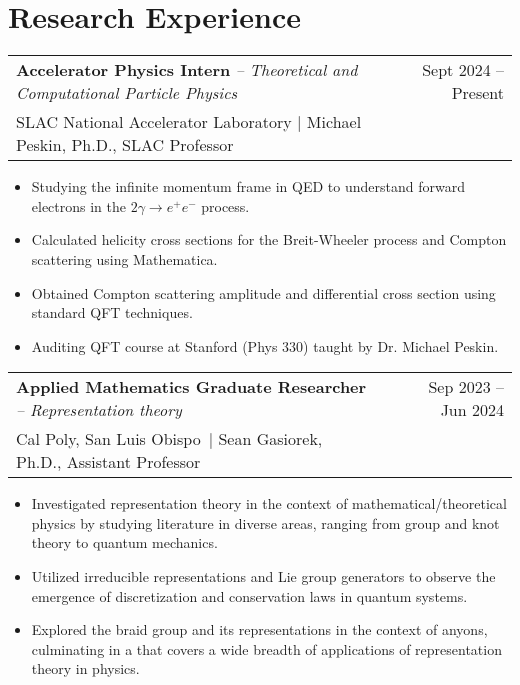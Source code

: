 \documentclass[a4paper,11pt]{article}
\makeatletter
\newcommand{\colhref}[3]{\href{#2}{\color{#1}{#3}}} %
\newenvironment{jobcustomlong}[4]
    {
    \begin{tabularx}{\linewidth}{@{}l X r@{}}
    \textbf{#1} \textit{#2} & \hfill &  #3 \\[-2.5pt]
    \textcolor{black!55!white}{\small #4} \\[2.5pt]
    \end{tabularx}
    \begin{minipage}[t]{\linewidth}
    \begin{itemize}[nosep,after=\strut, leftmargin=1.75em, itemsep=1pt,label={\small$\bullet$}]
    }
    {
    \end{itemize} \vspace{.325em}
    \end{minipage}   
    }
\newcommand{\calpoly}{\textcolor{black!55!white}{Cal Poly, San Luis Obispo}}
\makeatother
\begin{document}
\section{Research Experience} %
\begin{jobcustomlong}{Accelerator Physics Intern}{-- Theoretical and Computational Particle Physics}{Sept 2024 -- Present}{{SLAC} National Accelerator Laboratory $\vert$ Michael Peskin, Ph.D., SLAC Professor}
    \item Studying the infinite momentum frame in QED to understand forward electrons in the $2\gamma\to e^+e^-$ process.
    \item Calculated helicity cross sections for the Breit-Wheeler process and Compton scattering using Mathematica.
    \item Obtained Compton scattering amplitude and differential cross section using standard QFT techniques.
    \item Auditing QFT course at Stanford (Phys 330) taught by Dr. Michael Peskin.
\end{jobcustomlong}
\begin{jobcustomlong}{Applied Mathematics Graduate Researcher}{-- Representation theory}{Sep 2023 -- Jun 2024}{\calpoly\ $\vert$ Sean Gasiorek, Ph.D., Assistant Professor}
    \item Investigated representation theory in the context of mathematical/theoretical physics by studying literature in diverse areas, ranging from group and knot theory to quantum mechanics.
    \item Utilized irreducible representations and Lie group generators to observe the emergence of discretization and conservation laws in quantum systems.
    \item Explored the braid group and its representations in the context of anyons, culminating in a \colhref{blue!65!black}{https://digitalcommons.calpoly.edu/theses/2844/}{master's thesis} that covers a wide breadth of applications of representation theory in physics.
\end{jobcustomlong}
\end{document}
